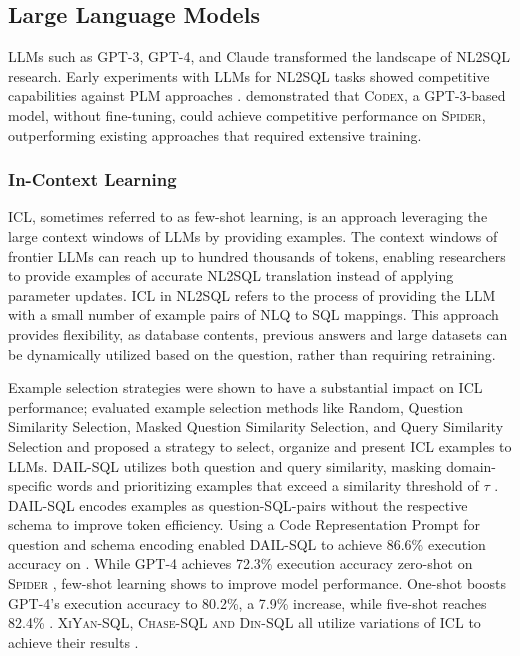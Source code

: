 \subsection{Large Language Models}

LLMs such as GPT-3, GPT-4, and Claude transformed the landscape of NL2SQL
research. Early experiments with LLMs for NL2SQL tasks showed competitive
capabilities against PLM approaches \citep{DAIL-SQL}. \cite{T2SQL-LLM-Bench-3}
demonstrated that \textsc{Codex}, a GPT-3-based model, without fine-tuning,
could achieve competitive performance on \textsc{Spider}, outperforming
existing approaches that required extensive training.

\subsubsection{In-Context Learning}

ICL, sometimes referred to as few-shot learning, is an approach leveraging the
large context windows of LLMs by providing examples. The context windows of
frontier LLMs can reach up to hundred thousands of tokens, enabling researchers
to provide examples of accurate NL2SQL translation instead of applying
parameter updates. ICL in NL2SQL refers to the process of providing the LLM
with a small number of example pairs of NLQ to SQL mappings. This approach
provides flexibility, as database contents, previous answers and large datasets
can be dynamically utilized based on the question, rather than requiring
retraining.

Example selection strategies were shown to have a substantial impact on ICL
performance; \cite{DAIL-SQL} evaluated example selection methods like Random,
Question Similarity Selection, Masked Question Similarity Selection, and Query
Similarity Selection and proposed a strategy to select, organize and present
ICL examples to LLMs. DAIL-SQL utilizes both question and query similarity,
masking domain-specific words and prioritizing examples that exceed a
similarity threshold of $\tau$ \citep[p.~5]{DAIL-SQL}. DAIL-SQL encodes
examples as question-SQL-pairs without the respective schema to improve token
efficiency. Using a Code Representation Prompt for question and schema encoding
enabled DAIL-SQL to achieve 86.6\% execution accuracy on \Spider. While GPT-4
achieves 72.3\% execution accuracy zero-shot on \textsc{Spider} \citep[Table 1,
p.~8]{DAIL-SQL}, few-shot learning shows to improve model performance. One-shot
boosts GPT-4's execution accuracy to 80.2\%, a 7.9\% increase, while five-shot
reaches 82.4\% \citep[Table 2, p.~8]{DAIL-SQL}. \textsc{XiYan-SQL, Chase-SQL
and Din-SQL} all utilize variations of ICL to achieve their results
\citep{XiYan, CHASE, DINSQL}.

